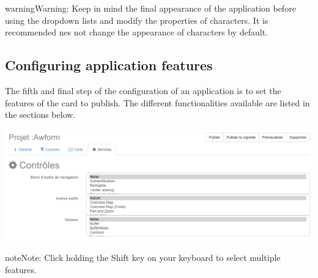 \documentclass[letterpaper,10pt,english]{sphinxmanual}
\begin{document}
\begin{notice}{warning}{Warning:}
Keep in mind the final appearance of the application before using the dropdown lists and modify the properties of characters. It is recommended nes not change the appearance of characters by default.
\end{notice}


\subsection{Configuring application features}
\label{apps/appconfig:configuration-des-fonctionnalites-de-l-application}
The fifth and final step of the configuration of an application is to set the features of the card to publish. The different functionalities available are listed in the sections below.

\includegraphics[width=1.000\linewidth]{publisher-controls-conf.png}

\begin{notice}{note}{Note:}
Click holding the Shift key on your keyboard to select multiple features.
\end{notice}
\end{document}
